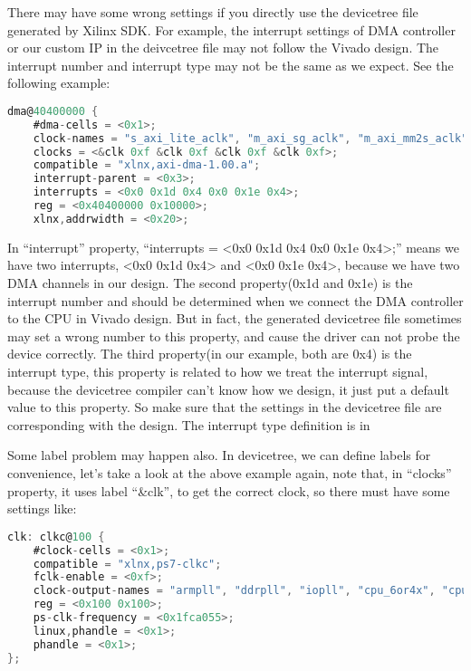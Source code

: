 There may have some wrong settings if you directly use the devicetree file generated by Xilinx SDK. For example, the interrupt settings of DMA controller or our custom IP in the deivcetree file may not follow the Vivado design. The interrupt number and interrupt type 
may not be the same as we expect. See the following example:

{\renewcommand\baselinestretch{0.8}\selectfont
\begin{lstlisting}[frame=single,language=C]
dma@40400000 {
	#dma-cells = <0x1>;
	clock-names = "s_axi_lite_aclk", "m_axi_sg_aclk", "m_axi_mm2s_aclk", "m_axi_s2mm_aclk";
	clocks = <&clk 0xf &clk 0xf &clk 0xf &clk 0xf>;
	compatible = "xlnx,axi-dma-1.00.a";
	interrupt-parent = <0x3>;
	interrupts = <0x0 0x1d 0x4 0x0 0x1e 0x4>;
	reg = <0x40400000 0x10000>;
	xlnx,addrwidth = <0x20>;
\end{lstlisting}
\par}

In ``interrupt'' property,	``interrupts = <0x0 0x1d 0x4 0x0 0x1e 0x4>;'' means we have two interrupts, <0x0 0x1d 0x4> and <0x0 0x1e 0x4>, because we have two DMA channels in our design. The second property(0x1d and 0x1e) is the interrupt number and should be determined when we connect the DMA controller to the CPU in Vivado design. But in fact, the generated devicetree file sometimes may set a wrong number to this property, and  cause the driver can not probe the device correctly. The third property(in our example, both are 0x4) is the interrupt type, this property is related to how we treat the interrupt signal, because the devicetree compiler can't know how we design, it just put a default value to this property. So make sure that the settings in the devicetree file are corresponding with the design. The interrupt type definition is in \cite{intterrupttypes}

Some label problem may happen also. In devicetree, we can define labels for convenience, let's take a look at the above example again, note that, in ``clocks'' property, it uses label ``\&clk'', to get the correct clock, so there must have some settings like:
\newpage

{\renewcommand\baselinestretch{0.8}\selectfont
\begin{lstlisting}[frame=single,language=C]
clk: clkc@100 {
	#clock-cells = <0x1>;
	compatible = "xlnx,ps7-clkc";
	fclk-enable = <0xf>;
	clock-output-names = "armpll", "ddrpll", "iopll", "cpu_6or4x", "cpu_3or2x", "cpu_2x", "cpu_1x", "ddr2x", "ddr3x", "dci", "lqspi", "smc", "pcap", "gem0", "gem1", "fclk0", "fclk1", "fclk2", "fclk3", "can0", "can1", "sdio0", "sdio1", "uart0", "uart1", "spi0", "spi1", "dma", "usb0_aper", "usb1_aper", "gem0_aper", "gem1_aper", "sdio0_aper", "sdio1_aper", "spi0_aper", "spi1_aper", "can0_aper", "can1_aper", "i2c0_aper", "i2c1_aper", "uart0_aper", "uart1_aper", "gpio_aper", "lqspi_aper", "smc_aper", "swdt", "dbg_trc", "dbg_apb";
	reg = <0x100 0x100>;
	ps-clk-frequency = <0x1fca055>;
	linux,phandle = <0x1>;
	phandle = <0x1>;
};
\end{lstlisting}
\par}

